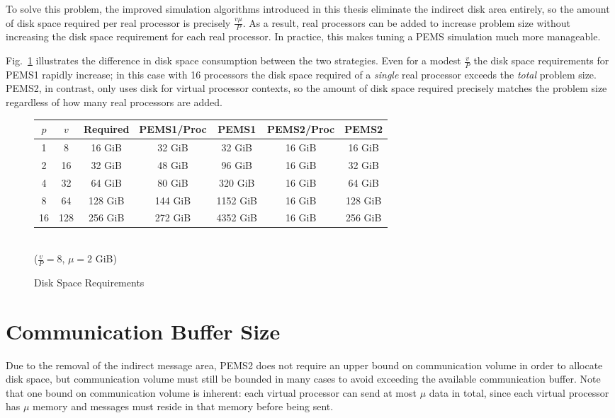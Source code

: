 \documentclass[12pt]{carletoncsthesis}
\begin{document}
To solve this problem, the improved simulation algorithms introduced in this
thesis eliminate the indirect disk area entirely, so the amount of disk space
required per real processor is precisely $\frac{v\mu}{P}$.  As a result,
real processors can be added to increase problem size without increasing
the disk space requirement for each real processor.  In practice, this makes
tuning a PEMS simulation much more manageable.

Fig.~\ref{disk-space} illustrates the difference in disk space consumption
between the two strategies.  Even for a modest $\frac{v}{P}$ the disk space
requirements for PEMS1 rapidly increase; in this case with 16 processors the
disk space required of a {\em single} real processor exceeds the {\em total}
problem size.  PEMS2, in contrast, only uses disk for virtual processor
contexts, so the amount of disk space required precisely matches the problem
size regardless of how many real processors are added.

\begin{figure}[ht]

\begin{center}
\begin{tabular}[]{ccccccc}
$p$ & $v$ & Required & PEMS1/Proc & PEMS1 & PEMS2/Proc & PEMS2 \\ \hline
1 & 8 & 16 GiB & 32 GiB & 32 GiB & 16 GiB & 16 GiB \\
2 & 16 & 32 GiB & 48 GiB & 96 GiB & 16 GiB & 32 GiB \\
4 & 32 & 64 GiB & 80 GiB & 320 GiB & 16 GiB & 64 GiB \\
8 & 64 & 128 GiB & 144 GiB & 1152 GiB & 16 GiB & 128 GiB \\
16 & 128 & 256 GiB & 272 GiB & 4352 GiB & 16 GiB & 256 GiB \\
\end{tabular}
\\ \bigskip
($\frac{v}{P} = 8$, $\mu = 2$ GiB)
\end{center}

\label{disk-space}
\caption{Disk Space Requirements}
\end{figure}


\section{Communication Buffer Size}
\label{comm-balance}


Due to the removal of the indirect message area, PEMS2 does not require
an upper bound on communication volume in order to allocate disk space, but
communication volume must still be bounded in many cases to avoid exceeding
the available communication buffer.  Note that one bound on communication
volume is inherent: each virtual processor can send at most $\mu$ data in
total, since each virtual processor has $\mu$ memory and messages must reside
in that memory before being sent.
\end{document}
